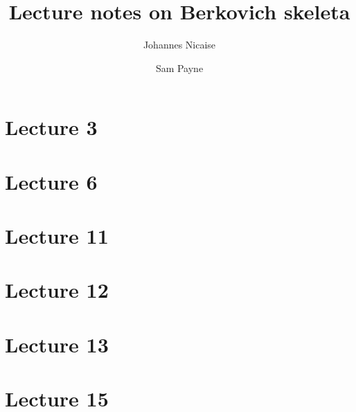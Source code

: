 \documentclass[10pt,a4paper]{article}
\title{Lecture notes on Berkovich skeleta}
\author{Johannes Nicaise \and Sam Payne}
\numberwithin{equation}{section}
\begin{document}
\maketitle



\section{Lecture 3}


\section{Lecture 6}




\section{Lecture 11}
\section{Lecture 12}
\section{Lecture 13}

\section{Lecture 15}
\end{document}
